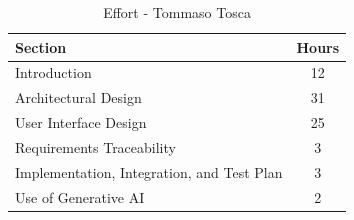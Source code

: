\begin{table}[H]
    \centering
\begin{tabular}{|l|c|}
        \hline
        \textbf{Section} & \textbf{Hours} \\ \hline
        Introduction & 12 \\ \hline
        Architectural Design & 31\\ \hline
        User Interface Design & 25\\ \hline
        Requirements Traceability & 3 \\ \hline
        Implementation, Integration, and Test Plan & 3 \\ \hline
        Use of Generative AI & 2 \\ \hline
    \end{tabular}
    \caption{Effort - Tommaso Tosca}
    \label{tab:efforttosca}
\end{table}